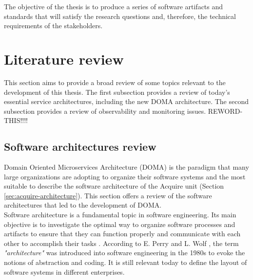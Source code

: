\documentclass[english, 12pt, a4paper, sci, utf8, a-1b, online]{aaltothesis}
\begin{document}
The objective of the thesis is to produce a series of software artifacts and standards that will satisfy the research questions and, therefore, the technical requirements of the stakeholders.

\clearpage
\section{Literature review}
\label{sec:literature-review}


This section aims to provide a broad review of some topics relevant to the development of this thesis. The first subsection provides a review of today's essential service architectures, including the new DOMA architecture. The second subsection provides a review of observability and monitoring issues. REWORD-THIS!!!!

\subsection{Software architectures review}


Domain Oriented Microservices Architecture (DOMA) is the paradigm that many large organizations are adopting to organize their software systems and the most suitable to describe the software architecture of the Acquire unit (Section  \ref{sec:acquire-architecture}). This section offers a review of the software architectures that led to the development of DOMA.\\

Software architecture is a fundamental topic in software engineering. Its main objective is to investigate the optimal way to organize software processes and artifacts to ensure that they can function properly and communicate with each other to accomplish their tasks \cite{shadija2017towards}. According to E. Perry and L. Wolf \cite{perry1992foundations}, the term \textit{"architecture"} was introduced into software engineering in the 1980s to evoke the notions of abstraction and coding. It is still relevant today to define the layout of software systems in different enterprises.\\
\end{document}
